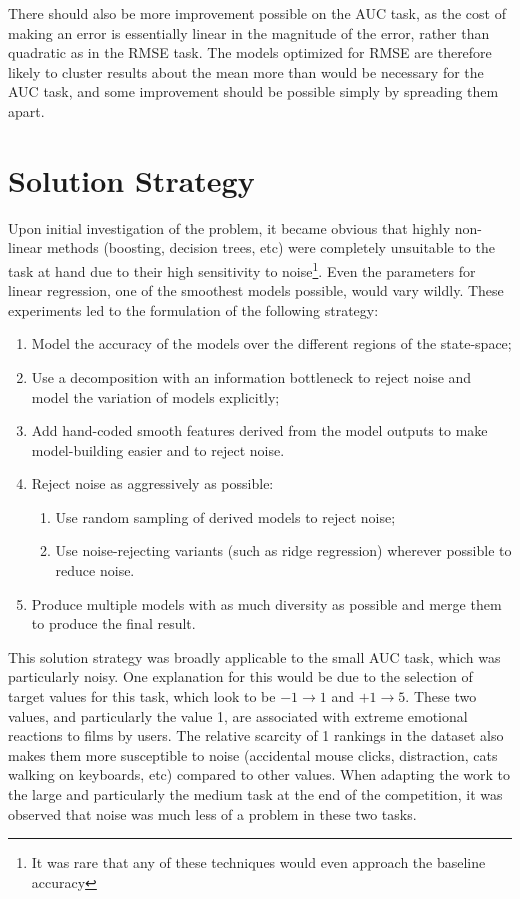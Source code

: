 \documentclass{article}
\begin{document}
There should also be more improvement possible on the AUC task, as the cost of making an error is essentially linear in the magnitude of the error, rather than quadratic as in the RMSE task.  The models optimized for RMSE are therefore likely to cluster results about the mean more than would be necessary for the AUC task, and some improvement should be possible simply by spreading them apart.

\section{Solution Strategy}

Upon initial investigation of the problem, it became obvious that highly non-linear methods (boosting, decision trees, etc) were completely unsuitable to the task at hand due to their high sensitivity to noise\footnote{It was rare that any of these techniques would even approach the baseline accuracy}.  Even the parameters for linear regression, one of the smoothest models possible, would vary wildly.  These experiments led to the formulation of the following strategy:

\begin{enumerate}
\item Model the accuracy of the models over the different regions of the state-space;
\item Use a decomposition with an information bottleneck to reject noise and model the variation of models explicitly;
\item Add hand-coded smooth features derived from the model outputs to make model-building easier and to reject noise.
\item Reject noise as aggressively as possible:
  \begin{enumerate}
  \item Use random sampling of derived models to reject noise;
  \item Use noise-rejecting variants (such as ridge regression) wherever possible to reduce noise.
    \end{enumerate}
\item Produce multiple models with as much diversity as possible and merge them to produce the final result.
\end{enumerate}

This solution strategy was broadly applicable to the small AUC task, which was particularly noisy.
One explanation for this would be due to the selection of target values for this task, which look to be $-1 \rightarrow 1$ and $+1 \rightarrow 5$.  
These two values, and particularly the value 1, are associated with extreme emotional reactions to films by users.  
The relative scarcity of 1 rankings in the dataset also makes them more susceptible to noise (accidental mouse clicks, distraction, cats walking on keyboards, etc) compared to other values.
When adapting the work to the large and particularly the medium task at the end of the competition, it was observed that noise was much less of a problem in these two tasks.
\end{document}
